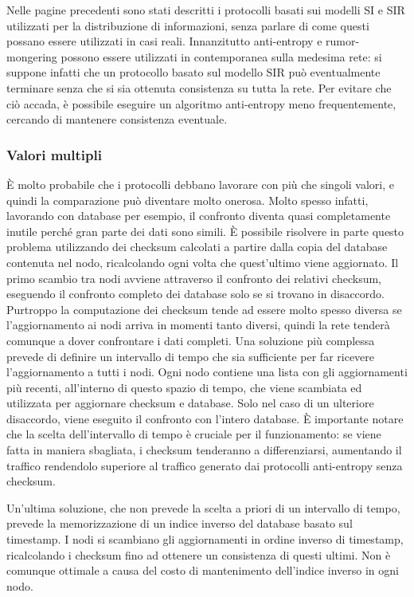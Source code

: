 Nelle pagine precedenti sono stati descritti i protocolli basati sui modelli SI e SIR utilizzati per la distribuzione di informazioni, senza parlare di come questi possano essere utilizzati in casi reali. Innanzitutto anti-entropy e rumor-mongering possono essere utilizzati in contemporanea sulla medesima rete: si suppone infatti che un protocollo basato sul modello SIR può eventualmente terminare senza che si sia ottenuta consistenza su tutta la rete. Per evitare che ciò accada, è possibile eseguire un algoritmo anti-entropy meno frequentemente, cercando di mantenere consistenza eventuale.


\subsubsection{Valori multipli}

È molto probabile che i protocolli debbano lavorare con più che singoli valori, e quindi la comparazione può diventare molto onerosa. Molto spesso infatti, lavorando con database per esempio, il confronto diventa quasi completamente inutile perché gran parte dei dati sono simili. È possibile risolvere in parte questo problema utilizzando dei checksum calcolati a partire dalla copia del database contenuta nel nodo, ricalcolando ogni volta che quest’ultimo viene aggiornato. Il primo scambio tra nodi avviene attraverso il confronto dei relativi checksum, eseguendo il confronto completo dei database solo se si trovano in disaccordo. Purtroppo la computazione dei checksum tende ad essere molto spesso diversa se l’aggiornamento ai nodi arriva in momenti tanto diversi, quindi la rete tenderà comunque a dover confrontare i dati completi. Una soluzione più complessa prevede di definire un intervallo di tempo che sia sufficiente per far ricevere l’aggiornamento a tutti i nodi. Ogni nodo contiene una lista con gli aggiornamenti più recenti, all’interno di questo spazio di tempo, che viene scambiata ed utilizzata per aggiornare checksum e database. Solo nel caso di un ulteriore disaccordo, viene eseguito il confronto con l’intero database. È importante notare che la scelta dell’intervallo di tempo è cruciale per il funzionamento: se viene fatta in maniera sbagliata, i checksum tenderanno a differenziarsi, aumentando il traffico rendendolo superiore al traffico generato dai protocolli anti-entropy senza checksum.

Un'ultima soluzione, che non prevede la scelta a priori di un intervallo di tempo, prevede la memorizzazione di un indice inverso del database basato sul timestamp. I nodi si scambiano gli aggiornamenti in ordine inverso di timestamp, ricalcolando i checksum fino ad ottenere un consistenza di questi ultimi. Non è comunque ottimale a causa del costo di mantenimento dell’indice inverso in ogni nodo.

